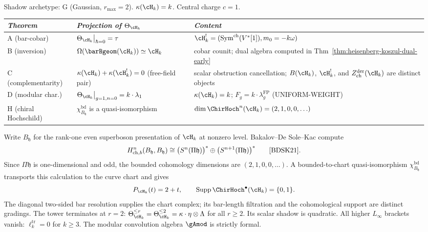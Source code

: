 \begin{computation}
\label{comp:heisenberg-five-theorems}
Shadow archetype: G (Gaussian, $r_{\max} = 2$).
$\kappa(\cH_k) = k$.
Central charge $c = 1$.
\begin{center}
\small
\renewcommand{\arraystretch}{1.3}
\begin{tabular}{lll}
\toprule
\emph{Theorem} & \emph{Projection of $\Theta_{\cH_k}$}
 & \emph{Content} \\
\midrule
A (bar-cobar) &
 $\Theta_{\cH_k}\big|_{\hbar=0} = \tau$ &
 $\cH_k^!=(\mathrm{Sym}^{\mathrm{ch}}(V^*[1]),m_0=-k\omega)$ \\
B (inversion) &
 $\Omega(\barBgeom(\cH_k)) \simeq \cH_k$ &
 cobar counit; dual algebra computed in Thm~\ref{thm:heisenberg-koszul-dual-early} \\
C (complementarity) &
 $\kappa(\cH_k) + \kappa(\cH_k^!) = 0$ \textup{(}free-field pair\textup{)} &
 scalar obstruction cancellation; $B(\cH_k)$, $\cH_k^!$, and
 $Z_{\mathrm{ch}}^{\mathrm{der}}(\cH_k)$ are distinct objects \\
D (modular char.) &
 $\Theta_{\cH_k}\big|_{g=1,n=0} = k \cdot \lambda_1$ &
$\kappa(\cH_k) = k$;\; $F_g = k \cdot \lambda_g^{\mathrm{FP}}$ \textup{(}UNIFORM-WEIGHT\textup{}) \\
H (chiral Hochschild) &
 $\chi^{\mathrm{bd}}_{B_{\mathfrak h}}$ is a quasi-isomorphism &
 $\dim\ChirHoch^n(\cH_k)=(2,1,0,0,\ldots)$ \\
\bottomrule
\end{tabular}
\end{center}
Write $B_{\mathfrak h}$ for the rank-one even superboson presentation
of $\cH_k$ at nonzero level.  Bakalov--De Sole--Kac compute
\[
 H^n_{\mathrm{ch},b}(B_{\mathfrak h},B_{\mathfrak h})
 \cong
 \bigl(S^n(\Pi\mathfrak h)\bigr)^*
 \oplus
 \bigl(S^{n+1}(\Pi\mathfrak h)\bigr)^*
 \qquad\textup{\cite[Theorem~7.4]{BDSK21}}.
\]
Since $\Pi\mathfrak h$ is one-dimensional and odd, the bounded
cohomology dimensions are $(2,1,0,0,\ldots)$.  A bounded-to-chart
quasi-isomorphism $\chi^{\mathrm{bd}}_{B_{\mathfrak h}}$ transports
this calculation to the curve chart and gives
\[
 P_{\cH_k}(t)=2+t,
 \qquad
 \operatorname{Supp}\ChirHoch^\bullet(\cH_k)=\{0,1\}.
\]
The diagonal two-sided bar resolution supplies the chart complex;
its bar-length filtration and the cohomological support are distinct
gradings.
The tower terminates at $r = 2$: $\Theta_{\cH_k}^{\leq r}
= \Theta_{\cH_k}^{\leq 2} = \kappa \cdot \eta \otimes \Lambda$
for all $r \geq 2$.  Its scalar shadow is quadratic.
All higher $L_\infty$ brackets vanish:
$\ell_k^{\mathrm{tr}} = 0$ for $k \geq 3$.
The modular convolution algebra $\gAmod$ is strictly formal.
\end{computation}

